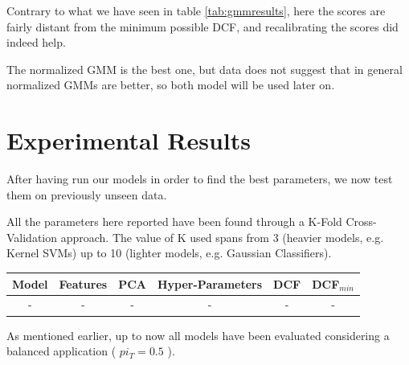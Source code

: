 \documentclass[12pt, twocolumn]{article}
\begin{document}
Contrary to what we have seen in table \ref{tab:gmmresults}, here the scores are fairly distant from the minimum possible DCF, and recalibrating the scores did indeed help.

The normalized GMM is the best one, but data does not suggest that in general normalized GMMs are better, so both model will be used later on.

\section{Experimental Results}

After having run our models in order to find the best parameters, we now test them on previously unseen data.

All the parameters here reported have been found through a K-Fold Cross-Validation approach.
The value of K used spans from 3 (heavier models, e.g. Kernel SVMs) up to 10 (lighter models, e.g. Gaussian Classifiers).

\begin{table}[t] 
    \centering
    \begin{tabular}{||c|c|c|c|c|c||}
        \hline 
        Model & Features & PCA & Hyper-Parameters & DCF & DCF$_{min}$ \\
        \hline
        - & - & - & - &  - & - \\
        \hline
    \end{tabular}
\end{table}

\newpage

As mentioned earlier, up to now all models have been evaluated considering a balanced application ( $pi_T = 0.5$ ).
\end{document}
